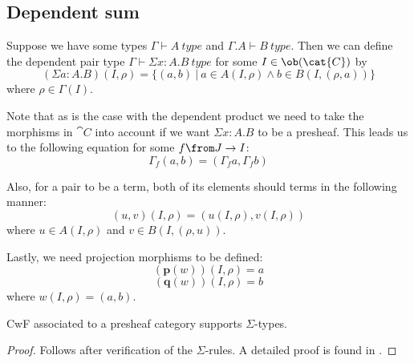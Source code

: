 \subsection*{Dependent sum}
Suppose we have some types $\Gamma \vdash A~type$ and $\Gamma.A \vdash B~type$.
Then we can define the dependent pair type $\Gamma \vdash \Sigma x:A.B~type$
for some $I \in \ob(\cat{C})$ by
\[
  (\Sigma a :A. B)(I, \rho) = \{(a, b)~|~a \in A(I, \rho) \land b \in B(I, (\rho, a))\}
\]
where $\rho \in \Gamma(I)$.

Note that as is the case with the dependent product we need to take the
morphisms in $\cat{C}$ into account if we want $\Sigma x:A.B$ to be a presheaf.
This leads us to the following equation for some $f \from J \to I$:
\[
  \Gamma_f(a, b) = (\Gamma_f a, \Gamma_f b)
\]

Also, for a pair to be a term, both of its elements should terms in the
following manner:
\[
  (u, v)(I, \rho) = (u(I, \rho), v(I, \rho))
\]
where $u \in A(I, \rho)$ and $v \in B(I, (\rho, u))$.

Lastly, we need projection morphisms to be defined:
\[
  (\mathbf{p}(w))(I, \rho) = a
\]
\[
  (\mathbf{q}(w))(I, \rho) = b
\]
where $w(I, \rho) = (a, b)$.

\begin{lemma}
  CwF associated to a presheaf category supports $\Sigma$-types.
  \begin{proof}
    Follows after verification of the $\Sigma$-rules. A detailed proof is found
    in \cite{Hofmann}.
  \end{proof}
\end{lemma}





